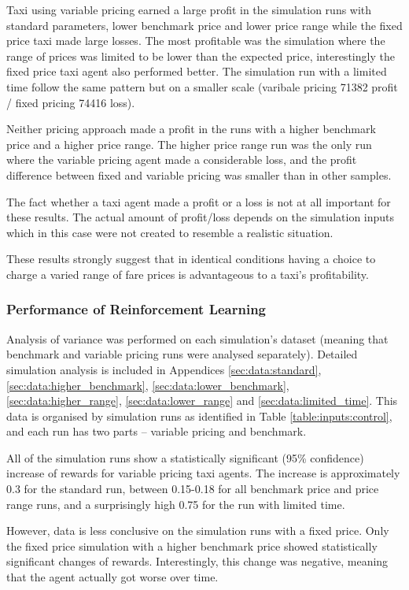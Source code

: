 Taxi using variable pricing earned a large profit in the simulation runs with
standard parameters, lower benchmark price and lower price range while the
fixed price taxi made large losses. The most profitable was the simulation
where the range of prices was limited to be lower than the expected price,
interestingly the fixed price taxi agent also performed better. The simulation
run with a limited time follow the same pattern but on a smaller scale
(varibale pricing 71382 profit / fixed pricing 74416 loss).

Neither pricing approach made a profit in the runs with a higher benchmark
price and a higher price range. The higher price range run was the only run
where the variable pricing agent made a considerable loss, and the profit
difference between fixed and variable pricing was smaller than in other
samples.

The fact whether a taxi agent made a profit or a loss is not at all important
for these results. The actual amount of profit/loss depends on the simulation
inputs which in this case were not created to resemble a realistic situation.

These results strongly suggest that in identical conditions having a choice to
charge a varied range of fare prices is advantageous to a taxi's profitability.


\subsubsection{Performance of Reinforcement Learning}

Analysis of variance was performed on each simulation's dataset (meaning that
benchmark and variable pricing runs were analysed separately). Detailed
simulation analysis is included in Appendices \ref{sec:data:standard},
\ref{sec:data:higher_benchmark}, \ref{sec:data:lower_benchmark},
\ref{sec:data:higher_range}, \ref{sec:data:lower_range} and
\ref{sec:data:limited_time}. This data is organised by simulation runs as
identified in Table \ref{table:inputs:control}, and each run has two parts --
variable pricing and benchmark.

All of the simulation runs show a statistically significant (95\% confidence)
increase of rewards for variable pricing taxi agents. The increase is
approximately 0.3 for the standard run, between 0.15-0.18 for all benchmark
price and price range runs, and a surprisingly high 0.75 for the run with
limited time.

However, data is less conclusive on the simulation runs with a fixed price.
Only the fixed price simulation with a higher benchmark price showed
statistically significant changes of rewards. Interestingly, this change was
negative, meaning that the agent actually got worse over time.

